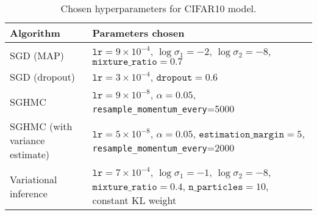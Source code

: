 \begin{table}[H]
    \centering
    \begin{tabular}{p{4cm}p{9cm}}
        \toprule
        Algorithm & Parameters chosen \\ \midrule
        SGD (MAP) & 
        $\texttt{lr}=9 \times 10^{-4}$, 
        $\log\sigma_1=-2$, 
        $\log\sigma_2=-8$, 
        $\texttt{mixture\_ratio}=0.7$ \\ \midrule
        SGD (dropout) & $\texttt{lr}=3\times 10^{-4}$,
        $\texttt{dropout}=0.6$ \\ \midrule
        SGHMC & $\texttt{lr}=9\times 10^{-8}$, $\alpha=0.05$, \texttt{resample\_momentum\_every}=5000 \\ \midrule
        SGHMC (with variance estimate) &  $\texttt{lr}= 5 \times 10^{-8}$, 
        $\alpha=0.05$,
        $\texttt{estimation\_margin}=5$, \texttt{resample\_momentum\_every}=2000 \\  \midrule
        Variational inference &    
        $\texttt{lr}=7 \times 10^{-4}$,
        $\log\sigma_1=-1$,
        $\log\sigma_2=-8$,
        $\texttt{mixture\_ratio}=0.4$,
        $\texttt{n\_particles}=10$, constant KL weight \\
        \bottomrule
    \end{tabular}
    \caption{Chosen hyperparameters for CIFAR10 model.}
    \label{tab:cifar10-small-hparams}
\end{table}